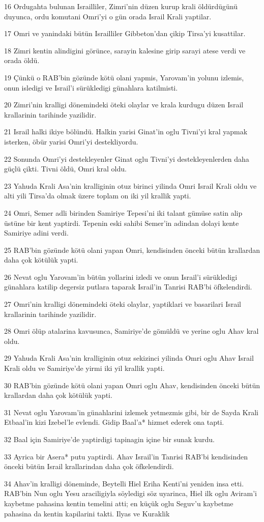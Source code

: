 \par 16 Ordugahta bulunan Israilliler, Zimri'nin düzen kurup krali öldürdügünü duyunca, ordu komutani Omri'yi o gün orada Israil Krali yaptilar.
\par 17 Omri ve yanindaki bütün Israilliler Gibbeton'dan çikip Tirsa'yi kusattilar.
\par 18 Zimri kentin alindigini görünce, sarayin kalesine girip sarayi atese verdi ve orada öldü.
\par 19 Çünkü o RAB'bin gözünde kötü olani yapmis, Yarovam'in yolunu izlemis, onun isledigi ve Israil'i sürükledigi günahlara katilmisti.
\par 20 Zimri'nin kralligi dönemindeki öteki olaylar ve krala kurdugu düzen Israil krallarinin tarihinde yazilidir.
\par 21 Israil halki ikiye bölündü. Halkin yarisi Ginat'in oglu Tivni'yi kral yapmak isterken, öbür yarisi Omri'yi destekliyordu.
\par 22 Sonunda Omri'yi destekleyenler Ginat oglu Tivni'yi destekleyenlerden daha güçlü çikti. Tivni öldü, Omri kral oldu.
\par 23 Yahuda Krali Asa'nin kralliginin otuz birinci yilinda Omri Israil Krali oldu ve alti yili Tirsa'da olmak üzere toplam on iki yil krallik yapti.
\par 24 Omri, Semer adli birinden Samiriye Tepesi'ni iki talant gümüse satin alip üstüne bir kent yaptirdi. Tepenin eski sahibi Semer'in adindan dolayi kente Samiriye adini verdi.
\par 25 RAB'bin gözünde kötü olani yapan Omri, kendisinden önceki bütün krallardan daha çok kötülük yapti.
\par 26 Nevat oglu Yarovam'in bütün yollarini izledi ve onun Israil'i sürükledigi günahlara katilip degersiz putlara taparak Israil'in Tanrisi RAB'bi öfkelendirdi.
\par 27 Omri'nin kralligi dönemindeki öteki olaylar, yaptiklari ve basarilari Israil krallarinin tarihinde yazilidir.
\par 28 Omri ölüp atalarina kavusunca, Samiriye'de gömüldü ve yerine oglu Ahav kral oldu.
\par 29 Yahuda Krali Asa'nin kralliginin otuz sekizinci yilinda Omri oglu Ahav Israil Krali oldu ve Samiriye'de yirmi iki yil krallik yapti.
\par 30 RAB'bin gözünde kötü olani yapan Omri oglu Ahav, kendisinden önceki bütün krallardan daha çok kötülük yapti.
\par 31 Nevat oglu Yarovam'in günahlarini izlemek yetmezmis gibi, bir de Sayda Krali Etbaal'in kizi Izebel'le evlendi. Gidip Baal'a* hizmet ederek ona tapti.
\par 32 Baal için Samiriye'de yaptirdigi tapinagin içine bir sunak kurdu.
\par 33 Ayrica bir Asera* putu yaptirdi. Ahav Israil'in Tanrisi RAB'bi kendisinden önceki bütün Israil krallarindan daha çok öfkelendirdi.
\par 34 Ahav'in kralligi döneminde, Beytelli Hiel Eriha Kenti'ni yeniden insa etti. RAB'bin Nun oglu Yesu araciligiyla söyledigi söz uyarinca, Hiel ilk oglu Aviram'i kaybetme pahasina kentin temelini atti; en küçük oglu Seguv'u kaybetme pahasina da kentin kapilarini takti. Ilyas ve Kuraklik

